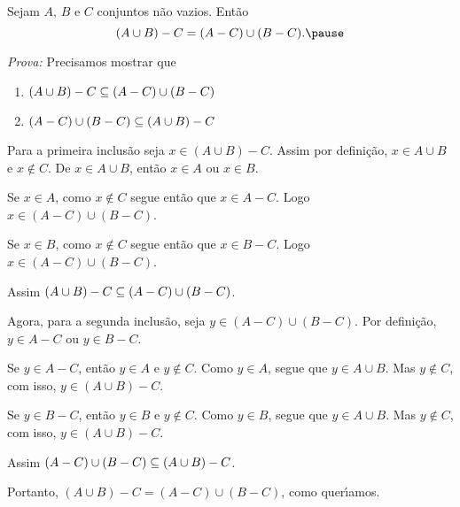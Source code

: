 \documentclass{beamer}
\begin{document}
    \begin{frame}
        \begin{proposicao}
            Sejam $A$, $B$ e $C$ \pause conjuntos n\~ao vazios. Ent\~ao\pause
            \[
                (A \cup B) - C = (A - C) \cup (B - C).\pause
            \]
        \end{proposicao}
        \textit{Prova: }\pause
        Precisamos mostrar que\pause
        \begin{enumerate}[label={\arabic*})]
            \item $(A \cup B) - C \subseteq (A - C) \cup (B - C)$\pause
            \item $(A - C) \cup (B - C) \subseteq  (A \cup B) - C$\pause
        \end{enumerate}
        Para a primeira inclus\~ao \pause seja $x \in (A \cup B) - C$. \pause Assim por defini\c{c}\~ao, \pause $x \in A \cup B$ \pause e $x \notin C$. \pause De $x \in A \cup B$, \pause ent\~ao $x \in A$ ou $x \in B$.\pause

        Se $x \in A$, \pause como $x \notin C$ \pause segue ent\~ao que $x \in A - C$. \pause Logo $x \in (A - C) \cup (B - C)$.\pause

        Se $x \in B$, \pause como $x \notin C$ \pause segue ent\~ao que $x \in B - C$. \pause Logo $x \in (A - C) \cup (B - C)$.\pause
    \end{frame}

    \begin{frame}
        Assim $(A \cup B) - C \subseteq (A - C) \cup (B - C)$.\pause

        Agora, para a segunda inclus\~ao, \pause seja $y \in (A - C) \cup (B - C)$. \pause Por defini\c{c}\~ao, \pause $y \in A - C$ ou $y \in B - C$.\pause

        Se $y \in A - C$, \pause ent\~ao $y \in A$ e $y \notin C$. \pause Como $y \in A$, \pause segue que $y \in A \cup B$. \pause Mas $y \notin C$, \pause com isso, $y \in (A \cup B) - C$.\pause

        Se $y \in B - C$, \pause ent\~ao $y \in B$ \pause e $y \notin C$. \pause Como $y \in B$, \pause segue que $y \in A \cup B$. \pause Mas $y \notin C$, \pause com isso, $y \in (A \cup B) - C$.\pause

        Assim $(A - C) \cup (B - C) \subseteq (A \cup B) - C$.\pause

        Portanto, \pause $(A \cup B) - C = (A - C) \cup (B - C)$, \pause como quer{\'\i}amos.\qedsymbol
    \end{frame}
\end{document}
